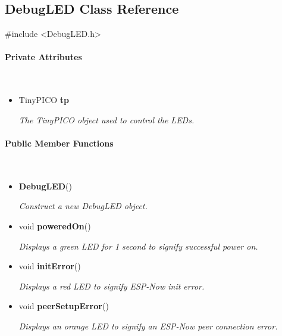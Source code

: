 \subsection{DebugLED Class Reference}
\label{subsec:debugled2}\mbox{}

    \ttfamily{}

    \#include <DebugLED.h>\\

    \rmfamily{}

    \paragraph{Private Attributes}\mbox{}\\

        \begin{itemize}
            \item TinyPICO \textbf{tp}
            
                \quad \quad \textit{The TinyPICO object used to control the LEDs.}\\

        \end{itemize}


    \paragraph{Public Member Functions}\mbox{}\\

        \begin{itemize}
            \item \textbf{DebugLED}() 
            
                \quad \quad \textit{Construct a new DebugLED object.}

            \item void \textbf{poweredOn}() 
            
                \quad \quad \textit{Displays a green LED for 1 second to signify successful power on.}

            \item void \textbf{initError}() 
            
                \quad \quad \textit{Displays a red LED to signify ESP-Now init error.}

            \item void \textbf{peerSetupError}() 
            
                \quad \quad \textit{Displays an orange LED to signify an ESP-Now peer connection error.}\\
        \end{itemize}

